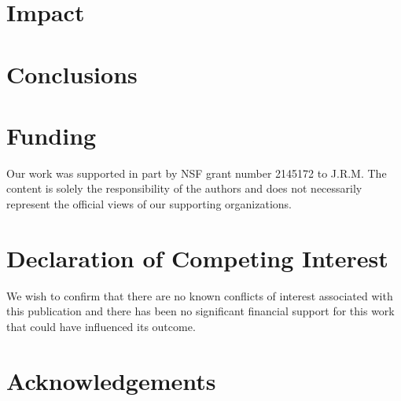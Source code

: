 \documentclass[preprint,12pt, a4paper]{elsarticle}
\begin{document}
\section{Impact}








\section{Conclusions}


\section*{Funding}
Our work was supported in part by NSF grant number 2145172 to J.R.M. The content is solely the responsibility of the authors and does not necessarily represent the official views of our supporting organizations.


\section*{Declaration of Competing Interest}
We wish to confirm that there are no known conflicts of interest associated with this publication and there has been no significant financial support for this work that could have influenced its outcome.


\section*{Acknowledgements}


 

\end{document}
